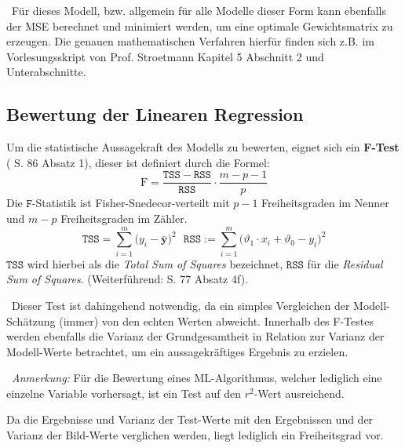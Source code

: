 ~\newline Für dieses Modell, bzw. allgemein für alle Modelle dieser Form kann ebenfalls der MSE berechnet und minimiert werden, um eine optimale Gewichtsmatrix zu erzeugen. Die genauen mathematischen Verfahren hierfür finden sich z.B. im Vorlesungsskript von Prof. Stroetmann \cite{stroetmann} Kapitel 5 Abschnitt 2 und Unterabschnitte.
\subsection{Bewertung der Linearen Regression}
\label{subsec:LinRegAcc}
Um die statistische Aussagekraft des Modells zu bewerten, eignet sich ein \textbf{F-Test} (\cite{stroetmann} S. 86 Absatz 1), dieser ist definiert durch die Formel:
\begin{equation}
\label{eq:F-statistic}
\mathrm{F} = \frac{\mathtt{TSS} - \mathtt{RSS}}{\mathtt{RSS}} \cdot \frac{m - p - 1}{p}
\end{equation}
Die $\mathtt{F}$-Statistik ist Fisher-Snedecor-verteilt mit $p-1$ Freiheitsgraden im Nenner und $m-p$ Freiheitsgraden im Zähler. 
\begin{equation}
\mathtt{TSS} = \sum\limits_{i=1}^m \bigl(y_i - \bar{\mathbf{y}}\bigr)^2 \ \ \
\mathtt{RSS} := \sum\limits_{i=1}^m \bigl(\vartheta_1 \cdot x_i + \vartheta_0 - y_i\bigr)^2
\end{equation}
$\mathtt{TSS}$ wird hierbei als die \textit{Total Sum of Squares} bezeichnet, $\mathtt{RSS}$ für die \textit{Residual Sum of Squares}. (Weiterführend: \cite{stroetmann} S. 77 Absatz 4f). 

~\newline Dieser Test ist dahingehend notwendig, da ein simples Vergleichen der Modell-Schätzung (immer) von den echten Werten abweicht. Innerhalb des F-Testes werden ebenfalls die Varianz der Grundgesamtheit in Relation zur Varianz der Modell-Werte betrachtet, um ein aussagekräftiges Ergebnis zu erzielen.


~\newline \textit{Anmerkung:} Für die Bewertung eines ML-Algorithmus, welcher lediglich eine einzelne Variable vorhersagt, ist ein Test auf den $r^2$-Wert ausreichend. 

Da die Ergebnisse und  Varianz der Test-Werte mit den Ergebnissen und der  Varianz der Bild-Werte verglichen werden, liegt lediglich ein Freiheitsgrad vor.  